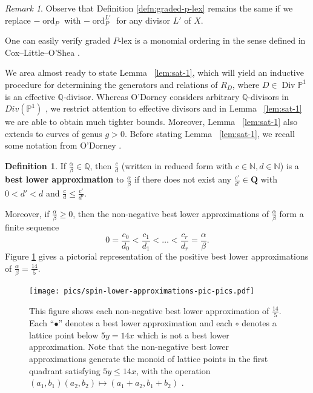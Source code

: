 \documentclass{amsart}
\theoremstyle{plain}
\theoremstyle{definition}
\newtheorem{defn}[thm]{Definition}
\theoremstyle{remark}
\newtheorem{rem}[thm]{Remark}
\numberwithin{equation}{section}
\newcommand\BN{{\mathbb N}}
\newcommand\BQ{{\mathbb Q}}
\newcommand\BP{{\mathbb P}}
\DeclareMathOperator{\ord}{ord}
\DeclareMathOperator\di{Div}
\begin{document}
\begin{rem}\label{rem:graded-P-lex-independent-of-line-bundle}
Observe that Definition \ref{defn:graded-p-lex} remains the same if we replace $-\ord_P$ with $-\ord_P^{L'}$ for any divisor $L'$ of $X$.
\end{rem}

\noindent One can easily verify graded $P$-lex is a monomial ordering in the sense defined in Cox--Little--O'Shea \cite[Chapter 2, $\mathsection$ 2, Definition 1]{cls:ideals-varieties-algorithms}.

We area almost ready to state Lemma ~\ref{lem:sat-1}, which will yield an inductive procedure for determining the generators and relations of $R_D$, where $D \in \di \BP^1$ is an effective $
\BQ$-divisor. Whereas O'Dorney considers arbitrary $\BQ$-divisors in $Div(\mathbb{P}^1)$ \cite[Theorem 8]{dorney:canonical}, we restrict attention to effective divisors and in Lemma ~\ref{lem:sat-1} we are able to obtain much tighter bounds.  Moreover, Lemma ~\ref{lem:sat-1} also extends to curves of genus $g > 0$. Before stating Lemma ~\ref{lem:sat-1}, we recall some notation from O'Dorney \cite{dorney:canonical}.

\begin{defn}\label{den:lower-approximation}
If $\frac{\alpha}{\beta}\in \BQ$, then $\frac{c}{d}$ (written in reduced form with $c \in \BN, d \in \BN$) is a {\bf{best lower approximation}} to $\frac{\alpha}{\beta}$ if there does not exist any $\frac{c'}{d'}\in \mathbf{Q}$ with $0<d'<d$ and $\frac{c}{d}\le \frac{c'}{d'}$. 
\end{defn}
Moreover, if $\frac{\alpha}{\beta}\ge 0$, then the non-negative best lower approximations of $\frac{\alpha}{\beta}$ form a finite sequence
\[
	0=\frac{c_0}{d_0} < \frac{c_1}{d_1} < \ldots < \frac{c_r}{d_r} = \frac{\alpha}{\beta}.
\]
Figure \ref{fig:s14/5-lattice} gives a pictorial representation of the positive best lower approximations of $\frac{\alpha}{\beta}=\frac{14}{5}$.

\begin{figure}
\texttt{[image: pics/spin-lower-approximations-pic-pics.pdf]}
\caption{This figure shows each non-negative best lower approximation of $\frac{14}{5}.$ Each ``$\bullet$'' denotes a best lower approximation and each $\circ$ denotes a lattice point below $5y=14x$ which is not a best lower approximation.  Note that the non-negative best lower approximations generate the monoid of lattice points in the first quadrant satisfying  $5y \le 14x$, with the operation $(a_1, b_1)(a_2, b_2)\mapsto (a_1 + a_2, b_1 + b_2)$ .}\label{fig:s14/5-lattice}
\end{figure}
\end{document}
